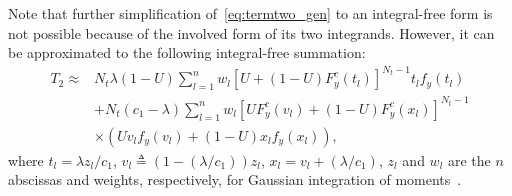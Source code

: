 \documentclass[journal]{IEEEtran}
\newcommand{\define}{\triangleq}
\newcommand{\lam}{\lambda}
\newcommand{\termtwo}{T_2}
\newcommand{\Nt}{{N_t}}
\newcommand{\cone}{c_{1}}
\newcommand{\vl}{v_{\lidx}}
\newcommand{\xl}{x_{\lidx}}
\newcommand{\lambyconeinl}{\lam/\cone}
\newcommand{\un}{U}
\newcommand{\pdfyNrgen}[1]{f_{y}\left(#1\right)} %
\newcommand{\ccdfy}[1]{F^{c}_{y}\left(#1 \right)}
\newcommand{\unccdfygen}[2]{{#1} \ccdfy{#2}  }
\newcommand{\gqsym}{z_{\lidx}}
\newcommand{\gqwt}{w_{\lidx}}
\newcommand{\lidx}{l}
\begin{document}
Note that further simplification of~\eqref{eq:termtwo_gen} to an integral-free form is not possible because of the involved form of its two integrands.  However, it can be approximated to the following integral-free summation:
%
\begin{align}
\label{eq:termtwo_approx}
\termtwo \approx &\Nt\lam(1-\un) \!\sum_{\lidx=1}^{n}  w_{\lidx}\!\left[\un + \unccdfygen{(1-\un)}{t_l}\!\right]^{\Nt-1} t_l f_{y}\left(t_l\right) \nonumber\\
&+ \Nt\left( \cone - \lam \right) \sum_{\lidx=1}^{n} w_{\lidx}
\left[\unccdfygen{\un}{\vl} +\unccdfygen{(1-\un)}{\xl}  \right]^{\Nt-1} \nonumber\\
&\times\left(\un \vl \pdfyNrgen{\vl} + (1-\un) \xl \pdfyNrgen{ \xl }\right),
\end{align}
where  $t_l={\lambda z_{l}}/{c_1}$, $\vl\define\left(1-\left( \lambyconeinl\right) \right) z_{\lidx}$,  $\xl=\vl+\left( \lambyconeinl\right) $, $\gqsym$ and $\gqwt$ are the $n$ abscissas and weights, respectively, for Gaussian integration of moments~\cite[pp. 921--922]{abramowitz_stegun}.
\end{document}

